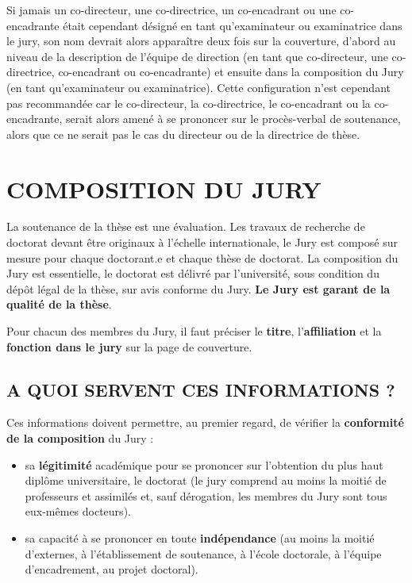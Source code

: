 \documentclass[french,12pt,a4paper]{book}
\begin{document}
Si jamais un co-directeur, une co-directrice, un co-encadrant ou une co-encadrante était cependant désigné en tant qu’examinateur ou examinatrice dans le jury, son nom devrait alors apparaître deux fois sur la couverture, d’abord au niveau de la description de l’équipe de direction (en tant que co-directeur, une co-directrice, co-encadrant ou co-encadrante) et ensuite dans la composition du Jury (en tant qu’examinateur ou examinatrice). Cette configuration n’est cependant pas recommandée car le co-directeur, la co-directrice, le co-encadrant ou la co-encadrante, serait alors amené à se prononcer sur le procès-verbal de soutenance, alors que ce ne serait pas le cas du directeur ou de la directrice de thèse.

\chapter{COMPOSITION DU JURY }
La soutenance de la thèse est une évaluation. Les travaux de recherche de doctorat devant être originaux à l’échelle internationale, le Jury est composé sur mesure pour chaque doctorant.e et chaque thèse de doctorat. La composition du Jury est essentielle, le doctorat est délivré par l’université, sous condition du dépôt légal de la thèse, sur avis conforme du Jury. \textbf{Le Jury est garant de la qualité de la thèse}.\\ \par
Pour chacun des membres du Jury, il faut préciser le \textbf{titre}, l’\textbf{affiliation} et la \textbf{fonction dans le jury} sur la page de couverture.

\section{A QUOI SERVENT CES INFORMATIONS ?}
Ces informations doivent permettre, au premier regard, de vérifier la \textbf{conformité de la composition} du Jury :

\begin{itemize}
	\renewcommand{\labelitemi}{$\bullet$}
	\item sa \textbf{légitimité} académique pour se prononcer sur l’obtention du plus haut diplôme universitaire, le doctorat (le jury comprend au moins la moitié de professeurs et assimilés et, sauf dérogation, les membres du Jury sont tous eux-mêmes docteurs). 
	\item sa capacité à se prononcer en toute \textbf{indépendance} (au moins la moitié d’externes, à l’établissement de soutenance, à l’école doctorale, à l’équipe d’encadrement, au projet doctoral).
\end{itemize}
\end{document}
